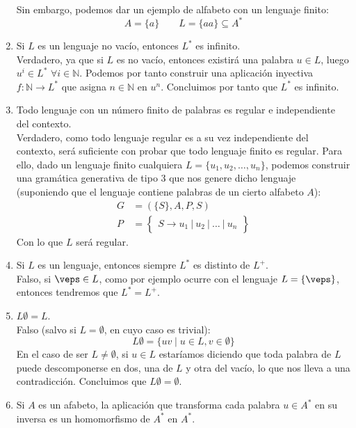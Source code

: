 \begin{enumerate}
        Sin embargo, podemos dar un ejemplo de alfabeto con un lenguaje finito:
        \begin{equation*}
            A = \{a\} \qquad L = \{aa\} \subseteq A^\ast
        \end{equation*}
    \item Si $L$ es un lenguaje no vacío, entonces $L^\ast$ es infinito.\\

        Verdadero, ya que si $L$ es no vacío, entonces existirá una palabra $u\in L$, luego $u^i\in L^\ast$ $\forall i \in \mathbb{N}$. Podemos por tanto construir una aplicación inyectiva $f:\mathbb{N}\rightarrow L^\ast$ que asigna $n\in \mathbb{N}$ en $u^n$. Concluimos por tanto que $L^\ast$ es infinito.
    \item Todo lenguaje con un número finito de palabras es regular e independiente del contexto.\\

        Verdadero, como todo lenguaje regular es a su vez independiente del contexto, será suficiente con probar que todo lenguaje finito es regular. Para ello, dado un lenguaje finito cualquiera $L=\{u_1, u_2, \ldots, u_n\}$, podemos construir una gramática generativa de tipo 3 que nos genere dicho lenguaje (suponiendo que el lenguaje contiene palabras de un cierto alfabeto $A$):
        \begin{align*}
            G &= (\{S\}, A, P, S) \\
            P &= \left\{\begin{array}{rl}
                S \rightarrow u_1\ |\ u_2\ |\ \ldots\ |\ u_n
            \end{array}\right\}
        \end{align*}
        Con lo que $L$ será regular.
    \item Si $L$ es un lenguaje, entonces siempre $L^\ast$ es distinto de $L^+$.\\

        Falso, si $\veps \in L$, como por ejemplo ocurre con el lenguaje $L = \{\veps\}$, entonces tendremos que $L^\ast = L^+$.
    \item $L\emptyset =L$.\\

        Falso (salvo si $L=\emptyset $, en cuyo caso es trivial):
        \begin{equation*}
            L\emptyset = \{uv \mid u\in L, v\in \emptyset \}
        \end{equation*}
        En el caso de ser $L\neq \emptyset$, si $u\in L$ estaríamos diciendo que toda palabra de $L$ puede descomponerse en dos, una de $L$ y otra del vacío, lo que nos lleva a una contradicción. Concluimos que $L\emptyset  = \emptyset $.
    \item \label{item:preg7}
    Si $A$ es un afabeto, la aplicación que transforma cada palabra $u\in A^\ast$ en su inversa es un homomorfismo de $A^\ast$ en $A^\ast$.\\


\end{enumerate}
